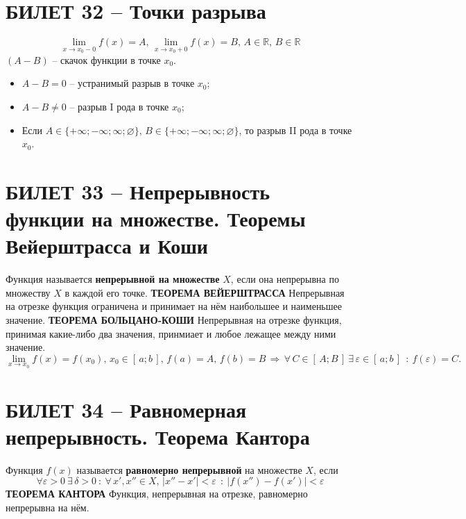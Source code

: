 \documentclass{article}
\newcommand{\R}{\mathbb R}
\begin{document}
\section{БИЛЕТ 32 -- Точки разрыва}
$$ \lim_{x\to x_0-0} f(x)=A,\, \lim_{x\to x_0+0} f(x) = B,\,A\in\R,\,B\in\R $$
$(A-B)$ -- скачок функции в точке $x_0$.
\begin{itemize}
    \item $A-B=0$ -- устранимый разрыв в точке $x_0$;
    \item $A-B\neq0$ -- разрыв I рода в точке $x_0$;
    \item Если $A\in\{+\infty;-\infty;\infty;\varnothing\},\,B\in\{+\infty;-\infty;\infty;\varnothing\}$, то разрыв II рода в точке $x_0$.
\end{itemize}
\newpage
\section{БИЛЕТ 33 -- Непрерывность функции на множестве. Теоремы Вейерштрасса и Коши}
Функция называется \textbf{непрерывной на множестве} $X$, если она непрерывна по множеству $X$ в каждой его точке.
\newline
\newline
\textbf{ТЕОРЕМА ВЕЙЕРШТРАССА} Непрерывная на отрезке функция ограничена и принимает на нём наибольшее и наименьшее значение.
\newline
\newline
\textbf{ТЕОРЕМА БОЛЬЦАНО-КОШИ} Непрерывная на отрезке функция, принимая какие-либо два значения, принмиает и любое лежащее между ними значение.
$$ \lim_{x\to x_0} f(x)=f(x_0),\,x_0\in [\,a;b\,],\,f(a)=A,\,f(b)=B\,\Rightarrow\,\forall\, C\in [\,A;B\,]\:\exists\,\varepsilon\in [\,a;b\,]\:\: :\: f(\varepsilon)=C. $$
\newpage
\section{БИЛЕТ 34 -- Равномерная непрерывность. Теорема Кантора}
Функция $f(x)$ называется \textbf{равномерно непрерывной} на множестве $X$, если 
$$ \forall \varepsilon>0\:\exists\,\delta>0\::\:\forall \,x', x''\in X,\,|x''-x'|<\varepsilon\:\::\:|f(x'')-f(x')|<\varepsilon $$
\textbf{ТЕОРЕМА КАНТОРА} Функция, непрерывная на отрезке, равномерно непрерывна на нём.
\newpage
\end{document}
